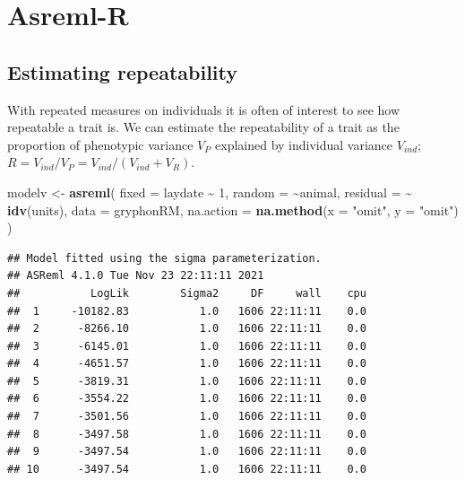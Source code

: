\documentclass[
  12pt,
]{book}
\newenvironment{Shaded}{\begin{snugshade}}{\end{snugshade}}
\newcommand{\DataTypeTok}[1]{\textcolor[rgb]{0.13,0.29,0.53}{#1}}
\newcommand{\DecValTok}[1]{\textcolor[rgb]{0.00,0.00,0.81}{#1}}
\newcommand{\KeywordTok}[1]{\textcolor[rgb]{0.13,0.29,0.53}{\textbf{#1}}}
\newcommand{\NormalTok}[1]{#1}
\newcommand{\OperatorTok}[1]{\textcolor[rgb]{0.81,0.36,0.00}{\textbf{#1}}}
\newcommand{\StringTok}[1]{\textcolor[rgb]{0.31,0.60,0.02}{#1}}
\begin{document}
\hypertarget{asreml-r-2}{%
\section{Asreml-R}\label{asreml-r-2}}

\hypertarget{estimating-repeatability}{%
\subsection{Estimating repeatability}\label{estimating-repeatability}}

With repeated measures on individuals it is often of interest to see how repeatable a trait is.
We can estimate the repeatability of a trait as the proportion of phenotypic variance \(V_P\) explained by individual variance \(V_{ind}\); \(R = V_{ind}/V_P = V_{ind}/(V_{ind}+V_R)\).

\begin{Shaded}
\begin{Highlighting}[]
\NormalTok{modelv \textless{}{-}}\StringTok{ }\KeywordTok{asreml}\NormalTok{(}
  \DataTypeTok{fixed =}\NormalTok{ laydate }\OperatorTok{\textasciitilde{}}\StringTok{ }\DecValTok{1}\NormalTok{,}
  \DataTypeTok{random =} \OperatorTok{\textasciitilde{}}\NormalTok{animal,}
  \DataTypeTok{residual =} \OperatorTok{\textasciitilde{}}\StringTok{ }\KeywordTok{idv}\NormalTok{(units),}
  \DataTypeTok{data =}\NormalTok{ gryphonRM,}
  \DataTypeTok{na.action =} \KeywordTok{na.method}\NormalTok{(}\DataTypeTok{x =} \StringTok{"omit"}\NormalTok{, }\DataTypeTok{y =} \StringTok{"omit"}\NormalTok{)}
\NormalTok{)}
\end{Highlighting}
\end{Shaded}

\begin{verbatim}
## Model fitted using the sigma parameterization.
## ASReml 4.1.0 Tue Nov 23 22:11:11 2021
##           LogLik        Sigma2     DF     wall    cpu
##  1     -10182.83           1.0   1606 22:11:11    0.0
##  2      -8266.10           1.0   1606 22:11:11    0.0
##  3      -6145.01           1.0   1606 22:11:11    0.0
##  4      -4651.57           1.0   1606 22:11:11    0.0
##  5      -3819.31           1.0   1606 22:11:11    0.0
##  6      -3554.22           1.0   1606 22:11:11    0.0
##  7      -3501.56           1.0   1606 22:11:11    0.0
##  8      -3497.58           1.0   1606 22:11:11    0.0
##  9      -3497.54           1.0   1606 22:11:11    0.0
## 10      -3497.54           1.0   1606 22:11:11    0.0
\end{verbatim}
\end{document}
